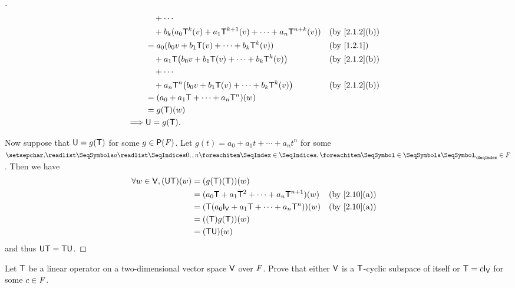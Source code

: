 \begin{proof}[]
\begin{align*}
		         & \quad + \cdots                                                                                     \\
		         & \quad + b_k (a_0 \T^k(v) + a_1 \T^{k + 1}(v) + \cdots + a_n \T^{n + k}(v)) &  & \by{2.1.2}[b]      \\
		         & = a_0 (b_0 v + b_1 \T(v) + \cdots + b_k \T^k(v))                           &  & \by{1.2.1}         \\
		         & \quad + a_1 \T\pa{b_0 v + b_1 \T(v) + \cdots + b_k \T^k(v)}                &  & \by{2.1.2}[b]      \\
		         & \quad + \cdots                                                                                     \\
		         & \quad + a_n \T^n\pa{b_0 v + b_1 \T(v) + \cdots + b_k \T^k(v)}              &  & \by{2.1.2}[b]      \\
		         & = (a_0 + a_1 \T + \cdots + a_n \T^n)(w)                                                            \\
		         & = g(\T)(w)                                                                                         \\
		\implies & \U = g(\T).
	\end{align*}

	Now suppose that \(\mathsf{U} = g(\mathsf{T})\) for some \(g \in \ps{\F}\).
	Let \(g(t) = a_0 + a_1 t + \cdots + a_n t^n\) for some \(\seq{a}{0,,n} \in \F\).
	Then we have
	\begin{align*}
		\forall w \in \V, (\U \T)(w) & = (g(\T)(\T))(w)                                                      \\
		                             & = (a_0 \T + a_1 \T^2 + \cdots + a_n \T^{n + 1})(w)  &  & \by{2.10}[a] \\
		                             & = (\T(a_0 \IT[\V] + a_1 \T + \cdots + a_n \T^n))(w) &  & \by{2.10}[a] \\
		                             & = ((\T) g(\T))(w)                                                     \\
		                             & = (\T \U)(w)
	\end{align*}
	and thus \(\mathsf{U} \mathsf{T} = \mathsf{T} \mathsf{U}\).
\end{proof}

\begin{ex}\label{ex:5.4.21}
	Let \(\mathsf{T}\) be a linear operator on a two-dimensional vector space \(\mathsf{V}\) over \(\mathit{F}\).
	Prove that either \(\mathsf{V}\) is a \(\mathsf{T}\)-cyclic subspace of itself or \(\T = c \IT[\V]\) for some \(c \in \mathit{F}\).
\end{ex}

